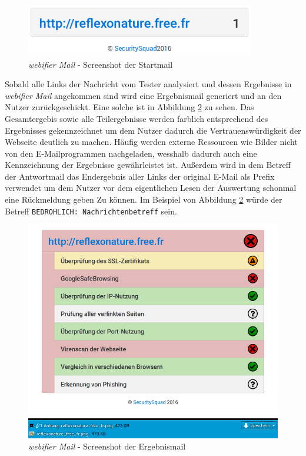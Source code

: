 \begin{figure}[H]
	\centering
	\includegraphics[width=10cm]{images/mail-start.png}
	\caption{\textit{webifier Mail} - Screenshot der Startmail}
	\label{fig:mail-start}
\end{figure}

Sobald alle Links der Nachricht vom Tester analysiert und dessen Ergebnisse in \textit{webifier Mail} angekommen sind wird eine Ergebnismail generiert und an den Nutzer zurückgeschickt. Eine solche ist in Abbildung \ref{fig:mail-result} zu sehen. Das Gesamtergebis sowie alle Teilergebnisse werden farblich entsprechend des Ergebnisses gekennzeichnet um dem Nutzer dadurch die Vertrauenswürdigkeit der Webseite deutlich zu machen. Häufig werden externe Ressourcen wie Bilder nicht von den E-Mailprogrammen nachgeladen, wesshalb dadurch auch eine Kennzeichnung der Ergebnisse gewährleistet ist. Außerdem wird in dem Betreff der Antwortmail das Endergebnis aller Links der original E-Mail als Prefix verwendet um dem Nutzer vor dem eigentlichen Lesen der Auswertung schonmal eine Rückmeldung geben Zu können. Im Beispiel von Abbildung \ref{fig:mail-result} würde der Betreff \lstinline[style=eclipse]{BEDROHLICH: Nachrichtenbetreff} sein.

\begin{figure}[H]
	\centering
	\includegraphics[width=15cm]{images/mail-result.png}
	\caption{\textit{webifier Mail} - Screenshot der Ergebnismail}
	\label{fig:mail-result}
\end{figure}

